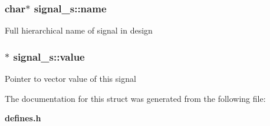 \subsubsection{\setlength{\rightskip}{0pt plus 5cm}char$\ast$ {\bf signal\_\-s::name}}\label{structsignal__s_o0}


Full hierarchical name of signal in design 
\subsubsection{$\ast$ {\bf signal\_\-s::value}}\label{structsignal__s_o1}


Pointer to vector value of this signal 

The documentation for this struct was generated from the following file:\begin{CompactItemize}
\item 
{\bf defines.h}\end{CompactItemize}
